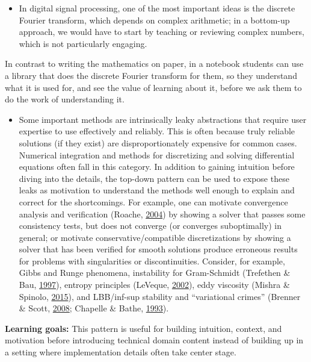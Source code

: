 \documentclass[]{book}
\providecommand{\tightlist}{%
  \setlength{\itemsep}{0pt}\setlength{\parskip}{0pt}}
\begin{document}
\begin{itemize}
\tightlist
\item
  In digital signal processing, one of the most important ideas is the
  discrete Fourier transform, which depends on complex arithmetic; in a
  bottom-up approach, we would have to start by teaching or reviewing
  complex numbers, which is not particularly engaging.
\end{itemize}

In contrast to writing the mathematics on paper, in a notebook students
can use a library that does the discrete Fourier transform for them, so
they understand what it is used for, and see the value of learning about
it, before we ask them to do the work of understanding it.

\begin{itemize}
\tightlist
\item
  Some important methods are intrinsically leaky abstractions that
  require user expertise to use effectively and reliably. This is often
  because truly reliable solutions (if they exist) are
  disproportionately expensive for common cases. Numerical integration
  and methods for discretizing and solving differential equations often
  fall in this category. In addition to gaining intuition before diving
  into the details, the top-down pattern can be used to expose these
  leaks as motivation to understand the methods well enough to explain
  and correct for the shortcomings. For example, one can motivate
  convergence analysis and verification (Roache,
  \protect\hyperlink{ref-roache2004bpc}{2004}) by showing a solver that
  passes some consistency tests, but does not converge (or converges
  suboptimally) in general; or motivate conservative/compatible
  discretizations by showing a solver that has been verified for smooth
  solutions produce erroneous results for problems with singularities or
  discontinuities. Consider, for example, Gibbs and Runge phenomena,
  instability for Gram-Schmidt (Trefethen \& Bau,
  \protect\hyperlink{ref-trefethen1997numerical}{1997}), entropy
  principles (LeVeque, \protect\hyperlink{ref-leveque2002finite}{2002}),
  eddy viscosity (Mishra \& Spinolo,
  \protect\hyperlink{ref-mishra2015accurate}{2015}), and LBB/inf-sup
  stability and ``variational crimes'' (Brenner \& Scott,
  \protect\hyperlink{ref-brenner2008mathematical}{2008}; Chapelle \&
  Bathe, \protect\hyperlink{ref-chapelle1993inf}{1993}).
\end{itemize}

\textbf{Learning goals:} This pattern is useful for building intuition,
context, and motivation before introducing technical domain content
instead of building up in a setting where implementation details often
take center stage.
\end{document}
